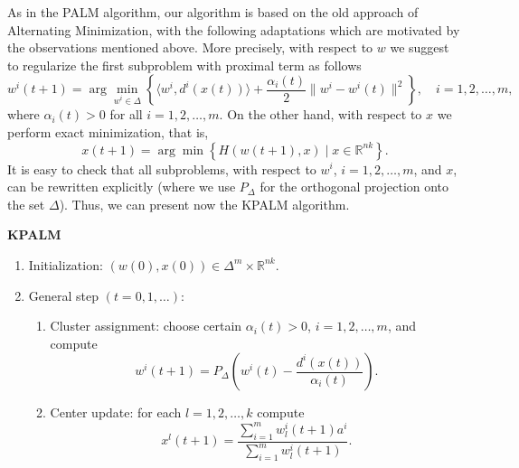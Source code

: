 As in the PALM algorithm, our algorithm is based on the old approach of Alternating Minimization, with the following adaptations which are motivated by the observations mentioned above. More precisely, with respect to $w$ we suggest to regularize the first subproblem with proximal term as follows
\begin{equation}
	w^i(t+1) = \arg\!\min\limits_{w^i \in \Delta} \left\lbrace \langle w^i , d^i(x(t)) \rangle + \frac{\alpha_i(t)}{2} \|w^i - w^i(t)\|^2 \right\rbrace, \quad i=1,2, \ldots, m , \label{State_w_update}
\end{equation}
where $\alpha_i(t) > 0$ for all $i=1,2, \ldots, m$. On the other hand, with respect to $x$ we perform exact minimization, that is,
\begin{equation}
	x(t+1) = \arg\!\min \left\lbrace H(w(t+1), x) \mid x \in \mathbb{R}^{nk} \right\rbrace . \label{State_x_update}
\end{equation}
It is easy to check that all subproblems, with respect to $w^i$, $i=1,2, \ldots, m$, and $x$, can be rewritten explicitly (where we use $P_{\Delta}$ for the orthogonal projection onto the set $\Delta$). Thus, we can present now the KPALM algorithm.
\begin{framed}
\noindent \textbf{KPALM}
\begin{enumerate}[(1)]
	\item Initialization: $(w(0),x(0)) \in \Delta^m \times \mathbb{R}^{nk} .$
	\item General step $\left( t=0,1, \ldots \right)$:
	\begin{enumerate}[(2.1)]
		\item Cluster assignment: choose certain $\alpha_i(t) > 0$, $i=1,2, \ldots, m$, and compute
		\begin{equation}
			w^i(t+1) = P_{\Delta} \left(w^i(t) - \frac{d^i(x(t))}{\alpha_i(t)}\right) . \label{StateEq5}
		\end{equation}
		\item Center update: for each $l=1, 2, \ldots ,k$ compute
		\begin{equation}
			x^l(t+1) = \frac{\sum_{i=1}^{m} w^i_l(t+1) a^i}{\sum_{i=1}^{m} w^i_l(t+1)} . \label{StateEq6}
		\end{equation}
	\end{enumerate}
\end{enumerate}
\end{framed}

